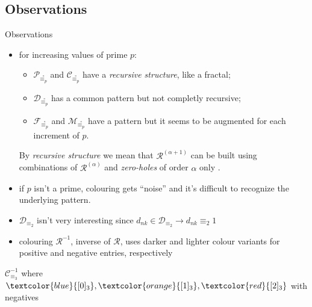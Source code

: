 \documentclass[10pt,serif, professionalfont]{beamer}
\begin{document}
\subsection{Observations}

\begin{frame}{Observations}
    \begin{itemize}
        \item for increasing values of prime $p$:
        \begin{itemize} 
            \item $\mathcal{P}_{\stackrel{\circ}{\equiv_{p}}}$ and
                $\mathcal{C}_{\stackrel{\circ}{\equiv_{p}}}$ have a \emph{recursive structure}, 
                like a fractal;
            \item $\mathcal{D}_{\stackrel{\circ}{\equiv_{p}}}$ has a common pattern but
                not completly recursive;
            \item $\mathcal{F}_{\stackrel{\circ}{\equiv_{p}}}$ and
                $\mathcal{M}_{\stackrel{\circ}{\equiv_{p}}}$ have a pattern but it seems
                to be augmented for each increment of $p$. 
        \end{itemize} 
        By \emph{recursive structure} we mean that $\mathcal{R}^{(\alpha+1)}$ can
        be built using combinations of  $\mathcal{R}^{(\alpha)}$ and \emph{zero-holes}
        of order $\alpha$ only .

        \pause
        \item if $p$ isn't a prime, colouring gets ``noise'' and it's difficult
        to recognize the underlying pattern.

        \pause
        \item $\mathcal{D}_{\equiv_{2}}$ isn't very interesting since
        $d_{nk}\in\mathcal{D}_{\equiv_{2}}\rightarrow d_{nk}\equiv_{2}1$

        \pause
        \item colouring $\mathcal{R}^{-1}$, inverse of $\mathcal{R}$, uses darker
        and lighter colour variants for positive and negative entries, respectively
    \end{itemize} 
\end{frame}

\begin{frame}{$\mathcal{C}_{\equiv_{3}}^{-1}$ where 
    $\textcolor{blue}{[0]_{3}},\textcolor{orange}{[1]_{3}},\textcolor{red}{[2]_{3}}$ with negatives}

    
\end{frame}
\end{document}
